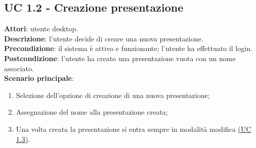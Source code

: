 \subsection{UC 1.2 - Creazione presentazione}{
	\label{uc1.2}
	\textbf{Attori}: utente desktop.	\\
	\textbf{Descrizione}: l'utente decide di creare una nuova presentazione.	\\
	\textbf{Precondizione}: il sistema è attivo e funzionante; l'utente ha effettuato il login.	\\
	\textbf{Postcondizione}: l'utente ha creato una presentazione vuota con un nome associato.	\\
	\textbf{Scenario principale}:
	\begin{enumerate}
		\item Selezione dell'opzione di creazione di una nuova presentazione;
		\item Assegnazione del nome alla presentazione creata;
		\item Una volta creata la presentazione si entra sempre in modalità modifica \hyperref[uc1.3]{(UC 1.3)}.
	\end{enumerate}
	}